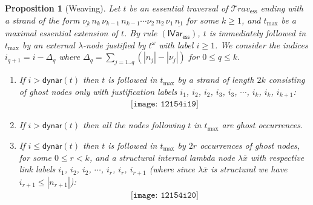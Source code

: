\documentclass[xchauthor,chkrefs,GCNS,amsmath,amsthm,rotating,leaveRGB]{tcsg}
\theoremstyle{plain}
\newtheorem{proposition}[theorem]{Proposition}
\theoremstyle{definition}
\newcommand\travset{\mathcal{T}\!rav}
\newcommand{\essential}{\mathsf{ess}}
\newcommand{\travsetes}{{\travset_{\essential}}}
\newcommand{\dynar}{\textsf{dynar}}
\begin{document}
\begin{proposition}[Weaving]\label{prop:weaving}
Let $t$ be an essential traversal of $\travsetes $ ending with a strand of
the form $\underline{\nu _{k}}\,n_{k}\,\nu _{k-1}\, n_{k-1}\cdots \nu
_{2}\,n_{2}\, \nu _{1}\,\underline{n_{1}}$ for some $k\geq 1$, and $t_{\max
}$ be a maximal essential extension of $t$. By rule $\mathbf
{(\mathsf{IVar_{\essential}  })}$, $t$ is immediately followed in $t_{\max }$
by an external $\lambda $-node justified by $t^\omega $ with label $i\geq 1$.
We consider the indices $i_{q+1} = i - \Delta _{q}$ where $\Delta _{q} = \sum
_{j=1..q} (|n_{j}| - |\nu _{j}|)$ for $0\leq q\leq k$.
%
\begin{enumerate}
\item[\textit{(i)}] If $i>\dynar (t)$ then $t$ is followed in $t_{\max }$ by a
    strand of length $2k$ consisting of ghost nodes only with justification
    labels $i_{1}$, $i_{2}$, $i_{2}$, $i_{3}$, $i_{3}$, $\cdots $, $i_{k}$,
    $i_{k}$, $i_{k+1}$:
%
\begin{eqnarray*}
\texttt{[image: 12154i19]}
\end{eqnarray*}

\item[\textit{(ii)}] If $i>\dynar (t)$ then all the nodes following $t$ in $t_{\max }$
are ghost occurrences.

\item[\textit{(iii)}] If $i\leq \dynar (t)$ then $t$ is followed in $t_{\max }$ by
    $2r$ occurrences of ghost nodes, for some $0 \leq r <k$, and a
    structural internal lambda node $\lambda \overline{x}$ with respective
    link labels $i_{1}$, $i_{2}$, $i_{2}$, $\cdots $, $i_{r}$, $i_{r}$,
    $i_{r+1}$ (where since $\lambda \overline{x}$ is structural we have
    $i_{r+1} \leq |n_{r+1}|$):
%
\begin{eqnarray*}
\texttt{[image: 12154i20]}
\end{eqnarray*}
\end{enumerate}
\end{proposition}
\end{document}
